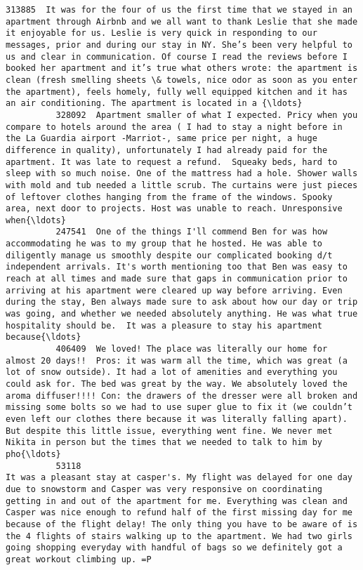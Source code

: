 \documentclass[11pt]{article}
\begin{document}
\begin{Verbatim}[commandchars=\\\{\}]
          313885  It was for the four of us the first time that we stayed in an apartment through Airbnb and we all want to thank Leslie that she made it enjoyable for us. Leslie is very quick in responding to our messages, prior and during our stay in NY. She’s been very helpful to us and clear in communication. Of course I read the reviews before I booked her apartment and it’s true what others wrote: the apartment is clean (fresh smelling sheets \& towels, nice odor as soon as you enter the apartment), feels homely, fully well equipped kitchen and it has an air conditioning. The apartment is located in a {\ldots}   
          328092  Apartment smaller of what I expected. Pricy when you compare to hotels around the area ( I had to stay a night before in the La Guardia airport -Marriot-, same price per night, a huge difference in quality), unfortunately I had already paid for the apartment. It was late to request a refund.  Squeaky beds, hard to sleep with so much noise. One of the mattress had a hole. Shower walls with mold and tub needed a little scrub. The curtains were just pieces of leftover clothes hanging from the frame of the windows. Spooky area, next door to projects. Host was unable to reach. Unresponsive when{\ldots}   
          247541  One of the things I'll commend Ben for was how accommodating he was to my group that he hosted. He was able to diligently manage us smoothly despite our complicated booking d/t independent arrivals. It's worth mentioning too that Ben was easy to reach at all times and made sure that gaps in communication prior to arriving at his apartment were cleared up way before arriving. Even during the stay, Ben always made sure to ask about how our day or trip was going, and whether we needed absolutely anything. He was what true hospitality should be.  It was a pleasure to stay his apartment because{\ldots}   
          406409  We loved! The place was literally our home for almost 20 days!!  Pros: it was warm all the time, which was great (a lot of snow outside). It had a lot of amenities and everything you could ask for. The bed was great by the way. We absolutely loved the aroma diffuser!!!! Con: the drawers of the dresser were all broken and missing some bolts so we had to use super glue to fix it (we couldn’t even left our clothes there because it was literally falling apart).  But despite this little issue, everything went fine. We never met Nikita in person but the times that we needed to talk to him by pho{\ldots}   
          53118                                                                                           It was a pleasant stay at casper's. My flight was delayed for one day due to snowstorm and Casper was very responsive on coordinating getting in and out of the apartment for me. Everything was clean and Casper was nice enough to refund half of the first missing day for me because of the flight delay! The only thing you have to be aware of is the 4 flights of stairs walking up to the apartment. We had two girls going shopping everyday with handful of bags so we definitely got a great workout climbing up. =P   

\end{Verbatim}
\end{document}
